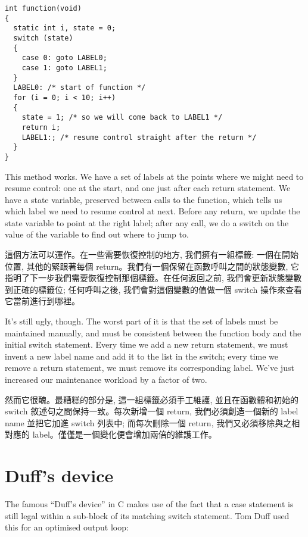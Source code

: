 \documentclass[12pt]{article}
\begin{document}
\begin{CJK}{UTF8}{bsmi}
\begin{lstlisting}[basicstyle=\footnotesize, breaklines=true]
int function(void) 
{
  static int i, state = 0;
  switch (state) 
  {
    case 0: goto LABEL0;
    case 1: goto LABEL1;
  }
  LABEL0: /* start of function */
  for (i = 0; i < 10; i++) 
  {
    state = 1; /* so we will come back to LABEL1 */
    return i;
    LABEL1:; /* resume control straight after the return */
  }
}
\end{lstlisting}

This method works. We have a set of labels at the points where we might need to resume control: one at the start, and one just after each return statement. We have a state variable, preserved between calls to the function, which tells us which label we need to resume control at next. Before any return, we update the state variable to point at the right label; after any call, we do a switch on the value of the variable to find out where to jump to.

這個方法可以運作。在一些需要恢復控制的地方, 我們擁有一組標籤: 一個在開始位置, 其他的緊跟著每個 return。我們有一個保留在函數呼叫之間的狀態變數, 它指明了下一步我們需要恢復控制那個標籤。在任何返回之前, 我們會更新狀態變數到正確的標籤位;
任何呼叫之後, 我們會對這個變數的值做一個 switch 操作來查看它當前進行到哪裡。

It's still ugly, though. The worst part of it is that the set of labels must be maintained manually, and must be consistent between the function body and the initial switch statement. Every time we add a new return statement, we must invent a new label name and add it to the list in the switch; every time we remove a return statement, we must remove its corresponding label. We've just increased our maintenance workload by a factor of two.


然而它很醜。最糟糕的部分是, 這一組標籤必須手工維護, 並且在函數體和初始的 switch 敘述句之間保持一致。每次新增一個 return, 我們必須創造一個新的 label name 並把它加進 switch 列表中;
而每次刪除一個 return, 我們又必須移除與之相對應的 label。僅僅是一個變化便會增加兩倍的維護工作。

\section{Duff's device}

The famous ``Duff's device'' in C makes use of the fact that a case statement is still legal within a sub-block of its matching switch statement. Tom Duff used this for an optimised output loop: 


\end{CJK}
\end{document}
